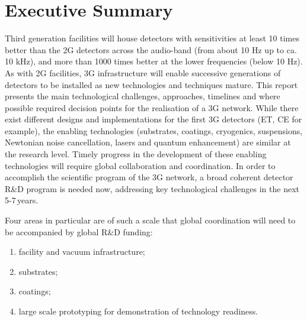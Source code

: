 \chapter{Executive Summary}
\label{sec:ExecSummary}
\renewcommand*{\thepage}{ES\roman{page}}
Third generation facilities will house detectors with sensitivities at least 10 times better than the 2G detectors across the audio-band (from about 10 Hz up to ca. 10 kHz), and more than 1000 times better at the lower frequencies (below 10 Hz).
As with 2G facilities, 3G infrastructure will enable successive generations of detectors to be installed as new technologies and techniques mature.  This report presents the main technological challenges, approaches, timelines and where possible required decision points for the realisation of a 3G network. While there exist different designs and implementations for the first 3G detectors (ET, CE for example), the enabling technologies (substrates, coatings, cryogenics, suspensions, Newtonian noise cancellation, lasers and quantum enhancement) are similar at the research level.  Timely progress in the development of these enabling technologies will require global collaboration and coordination. In order to accomplish the scientific program of the 3G network, a broad coherent detector R\&D program is needed now, addressing key technological challenges in the next 5-7\,years.

Four areas in particular are of such a scale that global coordination will need to be accompanied by global R\&D funding: 

\begin{enumerate}
\item facility and vacuum infrastructure; 
\item substrates; 
\item coatings; 
\item large scale prototyping for demonstration of technology readiness. 
\end{enumerate}

